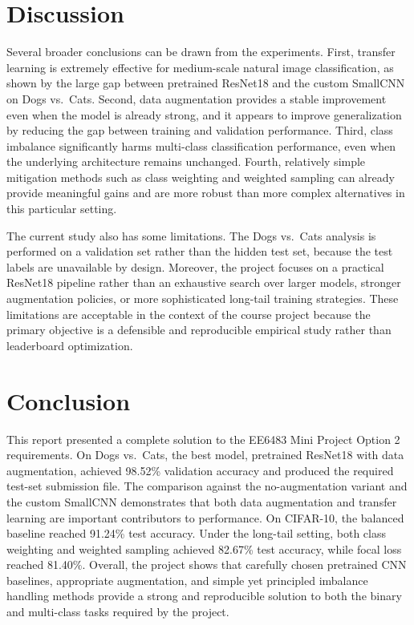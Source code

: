 \documentclass[11pt,a4paper]{article}
\begin{document}
\section{Discussion}
Several broader conclusions can be drawn from the experiments. First, transfer learning is extremely effective for medium-scale natural image classification, as shown by the large gap between pretrained ResNet18 and the custom SmallCNN on Dogs vs.\ Cats. Second, data augmentation provides a stable improvement even when the model is already strong, and it appears to improve generalization by reducing the gap between training and validation performance. Third, class imbalance significantly harms multi-class classification performance, even when the underlying architecture remains unchanged. Fourth, relatively simple mitigation methods such as class weighting and weighted sampling can already provide meaningful gains and are more robust than more complex alternatives in this particular setting.

The current study also has some limitations. The Dogs vs.\ Cats analysis is performed on a validation set rather than the hidden test set, because the test labels are unavailable by design. Moreover, the project focuses on a practical ResNet18 pipeline rather than an exhaustive search over larger models, stronger augmentation policies, or more sophisticated long-tail training strategies. These limitations are acceptable in the context of the course project because the primary objective is a defensible and reproducible empirical study rather than leaderboard optimization.

\section{Conclusion}
This report presented a complete solution to the EE6483 Mini Project Option 2 requirements. On Dogs vs.\ Cats, the best model, pretrained ResNet18 with data augmentation, achieved 98.52\% validation accuracy and produced the required test-set submission file. The comparison against the no-augmentation variant and the custom SmallCNN demonstrates that both data augmentation and transfer learning are important contributors to performance. On CIFAR-10, the balanced baseline reached 91.24\% test accuracy. Under the long-tail setting, both class weighting and weighted sampling achieved 82.67\% test accuracy, while focal loss reached 81.40\%. Overall, the project shows that carefully chosen pretrained CNN baselines, appropriate augmentation, and simple yet principled imbalance handling methods provide a strong and reproducible solution to both the binary and multi-class tasks required by the project.
\end{document}
